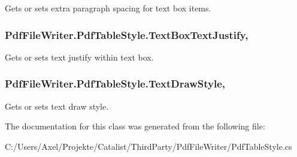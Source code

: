 Gets or sets extra paragraph spacing for text box items. 

\subsubsection[{\texorpdfstring{Text\+Box\+Text\+Justify}{TextBoxTextJustify}}]{ Pdf\+File\+Writer.\+Pdf\+Table\+Style.\+Text\+Box\+Text\+Justify\hspace{0.3cm}{\ttfamily [get]}, {\ttfamily [set]}}\hypertarget{class_pdf_file_writer_1_1_pdf_table_style_a7d586f9ce0d96760bdba635efc652647}{}\label{class_pdf_file_writer_1_1_pdf_table_style_a7d586f9ce0d96760bdba635efc652647}


Gets or sets text justify within text box. 

\subsubsection[{\texorpdfstring{Text\+Draw\+Style}{TextDrawStyle}}]{ Pdf\+File\+Writer.\+Pdf\+Table\+Style.\+Text\+Draw\+Style\hspace{0.3cm}{\ttfamily [get]}, {\ttfamily [set]}}\hypertarget{class_pdf_file_writer_1_1_pdf_table_style_a79266ca996701ec2d0f8cad46e80c22c}{}\label{class_pdf_file_writer_1_1_pdf_table_style_a79266ca996701ec2d0f8cad46e80c22c}


Gets or sets text draw style. 



The documentation for this class was generated from the following file\+:\begin{DoxyCompactItemize}
\item 
C\+:/\+Users/\+Axel/\+Projekte/\+Catalist/\+Third\+Party/\+Pdf\+File\+Writer/Pdf\+Table\+Style.\+cs\end{DoxyCompactItemize}
